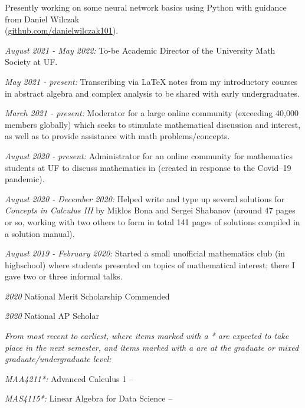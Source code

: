 \documentclass[11pt]{article}
\begin{document}
Presently working on some neural network basics using Python with guidance from Daniel Wilczak\\ (\href{https://github.com/danielwilczak101}{github.com/danielwilczak101}).

\noindent{}

\textsl{August 2021 - May 2022:} To-be Academic Director of the University Math Society at UF.

\textsl{May 2021 - present:} Transcribing via \LaTeX\hspace{1pt} notes from my introductory courses in abstract algebra and complex analysis to be shared with early undergraduates.

\textsl{March 2021 - present:} Moderator for a large online community (exceeding 40,000 members globally) which seeks to stimulate mathematical discussion and interest, as well as to provide assistance with math problems/concepts.

\textsl{August 2020 - present:} Administrator for an online community for mathematics students at UF to discuss mathematics in (created in response to the Covid--19 pandemic).

\textsl{August 2020 - December 2020:} Helped write and type up several solutions for \textsl{Concepts in Calculus
III} by Miklos Bona and Sergei Shabanov (around 47 pages or so, working with two others to form in total 141 pages of solutions compiled in a solution manual).

\textsl{August 2019 - February 2020:} Started a small unofficial mathematics club (in highschool) where students presented on topics of mathematical interest; there I gave two or three informal talks.

\noindent{}

\textsl{2020} National Merit Scholarship Commended

\textsl{2020} National AP Scholar

\noindent{}

\textsl{From most recent to earliest, where items marked with a * are expected to take place in the next semester, and items marked with a \textsuperscript{\textdagger} are at the graduate or mixed graduate/undergraduate level:}

\textsl{MAA4211*:} Advanced Calculus 1 --

\textsl{MAS4115*:} Linear Algebra for Data Science --
\end{document}
